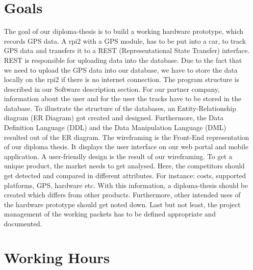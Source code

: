 \section*{Goals}
The goal of our diploma-thesis is to build a working hardware prototype, which records GPS data. A \gls{rpi2} with a GPS module, has to be put into a car, to track GPS data and transfers it to a REST (Representational State Transfer) interface. REST is responsible for uploading data into the database. Due to the fact that we need to upload the GPS data into our database, we have to store the data locally on the \gls{rpi2} if there is no internet connection. The program structure is described in our Software description section.
\newline \newline
For our partner company, information about the user and for the user the tracks have to be stored in the database. To illustrate the structure of the databases, an Entity-Relationship diagram (ER Diagram) got created and designed. Furthermore, the Data Definition Language (DDL) and the Data Manipulation Language (DML) resulted out of the ER diagram.
\newline \newline
The wireframing is the Front-End representation of our diploma thesis. It displays the user interface on our web portal and mobile application. A user-friendly design is the result of our wireframing.
\newline \newline
To get a unique product, the market needs to get analysed. Here, the competitors should get detected and compared in different attributes. For instance: costs, supported platforms, GPS, hardware etc. With this information, a diploma-thesis should be created which differs from other products. Furthermore, other intended uses of the hardware prototype should get noted down.
\newline \newline
Last but not least, the project management of the working packets has to be defined appropriate and documented.
\section*{Working Hours}

